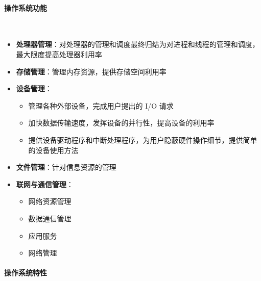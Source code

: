 \documentclass[cs4size,a4paper,10pt]{ctexart}
\begin{document}
		\paragraph{操作系统功能}~{}

		\begin{itemize}
			\item \textbf{处理器管理}：对处理器的管理和调度最终归结为对进程和线程的管理和调度，最大限度提高处理器利用率
			\item \textbf{存储管理}：管理内存资源，提供存储空间利用率
			\item \textbf{设备管理}：
			\begin{itemize}
				\item 管理各种外部设备，完成用户提出的 I/O 请求
				\item 加快数据传输速度，发挥设备的并行性，提高设备的利用率
				\item 提供设备驱动程序和中断处理程序，为用户隐蔽硬件操作细节，提供简单的设备使用方法
			\end{itemize}
			\item \textbf{文件管理}：针对信息资源的管理
			\item \textbf{联网与通信管理}：
			\begin{itemize}
				\item 网络资源管理
				\item 数据通信管理
				\item 应用服务
				\item 网络管理
			\end{itemize}
		\end{itemize}


		\paragraph{操作系统特性}~{}
\end{document}
